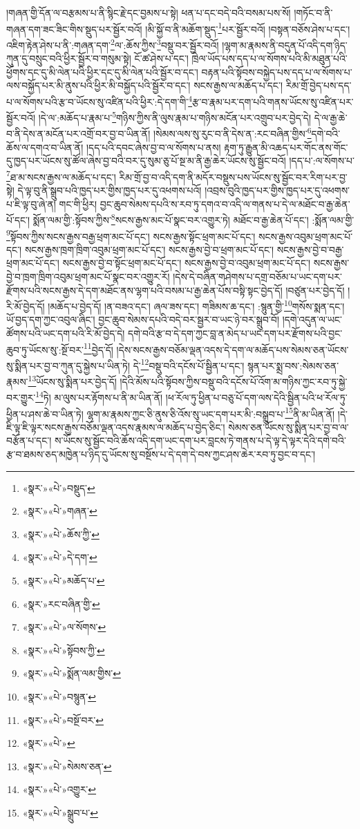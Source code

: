 །གཞན་གྱི་དོན་ལ་བརྩམས་པ་ནི་སྙིང་རྗེ་དང་བྱམས་པ་སྟེ། ཕན་པ་དང་བདེ་བའི་བསམ་པས་སོ། །གཏོང་བ་ནི་གཞན་དག་ཟང་ཟིང་གིས་སྡུད་པར་སྦྱོར་བའོ། །མི་སྐྱོ་བ་ནི་མཆོག་སྡུད་\footnote{«སྣར་»«པེ་»བསྡུད་}པར་སྦྱོར་བའོ། །བསྟན་བཅོས་ཤེས་པ་དང་། འཇིག་རྟེན་ཤེས་པ་ནི་:གཞན་དག་\footnote{«སྣར་»«པེ་»གཞན་}ལ་:ཆོས་ཀྱིས་\footnote{«སྣར་»«པེ་»ཆོས་ཀྱི་}བསྡུ་བར་སྦྱོར་བའོ། །ལྷག་མ་རྣམས་ནི་བདུན་པོ་འདི་དག་ཉིད་ཀུན་དུ་བསྲུང་བའི་ཕྱིར་སྦྱོར་བ་གསུམ་སྟེ། ངོ་ཚ་ཤེས་པ་དང་། ཁྲེལ་ཡོད་པས་དད་པ་ལ་སོགས་པའི་མི་མཐུན་པའི་ཕྱོགས་དང་དུ་མི་ལེན་པའི་ཕྱིར་དང་དུ་མི་ལེན་པའི་སྦྱོར་བ་དང་། བརྟན་པའི་སྟོབས་བསྐྱེད་པས་དད་པ་ལ་སོགས་པ་ལས་བསྐྱོད་པར་མི་ནུས་པའི་ཕྱིར་མི་བསྐྱོད་པའི་སྦྱོར་བ་དང་། སངས་རྒྱས་ལ་མཆོད་པ་དང་། རིམ་གྲོ་བྱེད་པས་དད་པ་ལ་སོགས་པའི་རྩ་བ་ཡོངས་སུ་འཛིན་པའི་ཕྱིར་:དེ་དག་གི་\footnote{«སྣར་»«པེ་»དེ་དག་}རྩ་བ་རྣམ་པར་དག་པའི་གནས་ཡོངས་སུ་འཛིན་པར་སྦྱོར་བའོ། །དེ་ལ་:མཆོད་པ་རྣམ་པ་\footnote{«སྣར་»«པེ་»མཆོད་པ་}གཉིས་ཀྱིས་ནི་ལུས་རྣམ་པ་གཉིས་མངོན་པར་འགྲུབ་པར་བྱེད་དེ། དེ་ལ་རྒྱ་ཆེ་བ་ནི་དེས་ན་མངོན་པར་འགྲོ་བར་བྱ་བ་ཡིན་ནོ། །སེམས་ལས་སུ་རུང་བ་ནི་དེས་ན་:རང་བཞིན་གྱིས་\footnote{«སྣར་»རང་བཞིན་གྱི་}དགེ་བའི་ཆོས་ལ་དགའ་བ་ཡིན་ནོ། །དད་པའི་དབང་ཞེས་བྱ་བ་ལ་སོགས་པ་ནས། རྟག་ཏུ་རྒྱུན་མི་འཆད་པར་གོང་ནས་གོང་དུ་ཁྱད་པར་ཡོངས་སུ་ཚོལ་ཞེས་བྱ་བའི་བར་དུ་སུམ་ཅུ་པོ་སྔ་མ་ནི་རྒྱ་ཆེར་ཡོངས་སུ་སྦྱོང་བའོ། །དད་པ་:ལ་སོགས་པ་\footnote{«སྣར་»«པེ་»ལ་སོགས་}ཐ་མ་སངས་རྒྱས་ལ་མཆོད་པ་དང་། རིམ་གྲོ་བྱ་བ་འདི་དག་ནི་མདོར་བསྡུས་པས་ཡོངས་སུ་སྦྱོང་བར་རིག་པར་བྱ་སྟེ། དེ་ལྟ་བུ་ནི་སྒྲུབ་པའི་ཁྱད་པར་གྱིས་ཁྱད་པར་དུ་འཕགས་པའོ། །འབྲས་བུའི་ཁྱད་པར་གྱིས་ཁྱད་པར་དུ་འཕགས་པ་ཇི་ལྟ་བུ་ཞེ་ན། གང་གི་ཕྱིར། བྱང་ཆུབ་སེམས་དཔའི་ས་རབ་ཏུ་དགའ་བ་འདི་ལ་གནས་པ་དེ་ལ་མཐོང་བ་རྒྱ་ཆེན་པོ་དང་། སྨོན་ལམ་གྱི་:སྟོབས་ཀྱིས་\footnote{«སྣར་»«པེ་»སྟོབས་ཀྱི་}སངས་རྒྱས་མང་པོ་སྣང་བར་འགྱུར་ཏེ། མཐོང་བ་རྒྱ་ཆེན་པོ་དང་། :སྨོན་ལམ་གྱི་\footnote{«སྣར་»«པེ་»སྨོན་ལམ་གྱིས་}སྟོབས་ཀྱིས་སངས་རྒྱས་བརྒྱ་ཕྲག་མང་པོ་དང་། སངས་རྒྱས་སྟོང་ཕྲག་མང་པོ་དང་། སངས་རྒྱས་འབུམ་ཕྲག་མང་པོ་དང་། སངས་རྒྱས་ཁྲག་ཁྲིག་འབུམ་ཕྲག་མང་པོ་དང་། སངས་རྒྱས་བྱེ་བ་ཕྲག་མང་པོ་དང་། སངས་རྒྱས་བྱེ་བ་བརྒྱ་ཕྲག་མང་པོ་དང་། སངས་རྒྱས་བྱེ་བ་སྟོང་ཕྲག་མང་པོ་དང་། སངས་རྒྱས་བྱེ་བ་འབུམ་ཕྲག་མང་པོ་དང་། སངས་རྒྱས་བྱེ་བ་ཁྲག་ཁྲིག་འབུམ་ཕྲག་མང་པོ་སྣང་བར་འགྱུར་རོ། །དེས་དེ་བཞིན་གཤེགས་པ་དགྲ་བཅོམ་པ་ཡང་དག་པར་རྫོགས་པའི་སངས་རྒྱས་དེ་དག་མཐོང་ནས་ལྷག་པའི་བསམ་པ་རྒྱ་ཆེན་པོས་བསྟི་སྟང་བྱེད་དོ། །བཙུན་པར་བྱེད་དོ། །རི་མོ་བྱེད་དོ། །མཆོད་པ་བྱེད་དོ། །ན་བཟའ་དང་། ཞལ་ཟས་དང་། གཟིམས་ཆ་དང་། :སྙུན་གྱི་\footnote{«སྣར་»«པེ་»བསྙུན་}གསོས་སྨན་དང་། ཡོ་བྱད་དག་ཀྱང་འབུལ་ཞིང་། བྱང་ཆུབ་སེམས་དཔའི་བདེ་བར་སྦྱར་བ་ཡང་ཉེ་བར་སྒྲུབ་བོ། །དགེ་འདུན་ལ་ཡང་ཚོགས་པའི་ཡང་དག་པའི་རི་མོ་བྱེད་དེ། དགེ་བའི་རྩ་བ་དེ་དག་ཀྱང་བླ་ན་མེད་པ་ཡང་དག་པར་རྫོགས་པའི་བྱང་ཆུབ་ཏུ་ཡོངས་སུ་:སྔོ་བར་\footnote{«སྣར་»«པེ་»བསྔོ་བར་}བྱེད་དོ། །དེས་སངས་རྒྱས་བཅོམ་ལྡན་འདས་དེ་དག་ལ་མཆོད་པས་སེམས་ཅན་ཡོངས་སུ་སྨིན་པར་བྱ་བ་ཀུན་དུ་སྐྱེས་པ་ཡིན་ཏེ། དེ་\footnote{«སྣར་»«པེ་»}བསྡུ་བའི་དངོས་པོ་སྦྱིན་པ་དང་། སྙན་པར་སྨྲ་བས་:སེམས་ཅན་རྣམས་\footnote{«སྣར་»«པེ་»སེམས་ཅན་}ཡོངས་སུ་སྨིན་པར་བྱེད་དོ། །དེའི་མོས་པའི་སྟོབས་ཀྱིས་བསྡུ་བའི་དངོས་པོ་འོག་མ་གཉིས་ཀྱང་རབ་ཏུ་སྐྱེ་བར་གྱུར་\footnote{«སྣར་»«པེ་»འགྱུར་}ཏེ། མ་ལུས་པར་རྟོགས་པ་ནི་མ་ཡིན་ནོ། །ཕ་རོལ་ཏུ་ཕྱིན་པ་བཅུ་པོ་དག་ལས་དེའི་སྦྱིན་པའི་ཕ་རོལ་ཏུ་ཕྱིན་པ་ཤས་ཆེ་བ་ཡིན་ཏེ། ལྷག་མ་རྣམས་ཀྱང་ཅི་ནུས་ཅི་འོས་སུ་ཡང་དག་པར་མི་:བསྒྲུབ་པ་\footnote{«སྣར་»«པེ་»སྒྲུབ་པ་}ནི་མ་ཡིན་ནོ། །དེ་ཇི་ལྟ་ཇི་ལྟར་སངས་རྒྱས་བཅོམ་ལྡན་འདས་རྣམས་ལ་མཆོད་པ་བྱེད་ཅིང་། སེམས་ཅན་ཡོངས་སུ་སྨིན་པར་བྱ་བ་ལ་བརྩོན་པ་དང་། ས་ཡོངས་སུ་སྦྱོང་བའི་ཆོས་འདི་དག་ཡང་དག་པར་བླངས་ཏེ་གནས་པ་དེ་ལྟ་དེ་ལྟར་དེའི་དགེ་བའི་རྩ་བ་ཐམས་ཅད་མཁྱེན་པ་ཉིད་དུ་ཡོངས་སུ་བསྔོས་པ་དེ་དག་དེ་བས་ཀྱང་ཤས་ཆེར་རབ་ཏུ་བྱང་བ་དང་། 